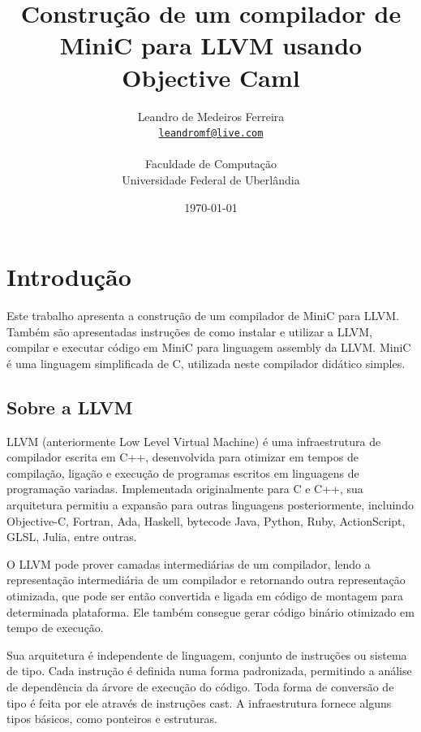 \documentclass[12pt,a4paper,twoside]{report}
\title{Construção de um compilador de MiniC para LLVM usando Objective Caml}
\date{}
\author{Leandro de Medeiros Ferreira \\
\texttt{\small \url{leandromf@live.com}}\\
\vspace{10cm} \\
Faculdade de Computação \\
Universidade Federal de Uberlândia
}
\date{\today}
\begin{document}
  \maketitle
\listoffigures            
\listoftables            
\lstlistoflistings

\tableofcontents    


\fancyhead[RE,LO]{\thesection}

\setlength{\parskip}{0.15in} %

\chapter{Introdução}
Este trabalho apresenta a construção de um compilador de MiniC para LLVM. Também são apresentadas instruções de como instalar e utilizar a LLVM, compilar e executar código em MiniC para linguagem assembly da LLVM. MiniC é uma linguagem simplificada de C, utilizada neste compilador didático simples.

\section{Sobre a LLVM}
LLVM (anteriormente Low Level Virtual Machine) é uma infraestrutura de compilador escrita em C++, desenvolvida para otimizar em tempos de compilação, ligação e execução de programas escritos em linguagens de programação variadas. Implementada originalmente para C e C++, sua arquitetura permitiu a expansão para outras linguagens posteriormente, incluindo Objective-C, Fortran, Ada, Haskell, bytecode Java, Python, Ruby, ActionScript, GLSL, Julia, entre outras.

O LLVM pode prover camadas intermediárias de um compilador, lendo a representação intermediária de um compilador e retornando outra representação otimizada, que pode ser então convertida e ligada em código de montagem para determinada plataforma. Ele também consegue gerar código binário otimizado em tempo de execução.

Sua arquitetura é independente de linguagem, conjunto de instruções ou sistema de tipo. Cada instrução é definida numa forma padronizada, permitindo a análise de dependência da árvore de execução do código. Toda forma de conversão de tipo é feita por ele através de instruções cast. A infraestrutura fornece alguns tipos básicos, como ponteiros e estruturas.
\end{document}
